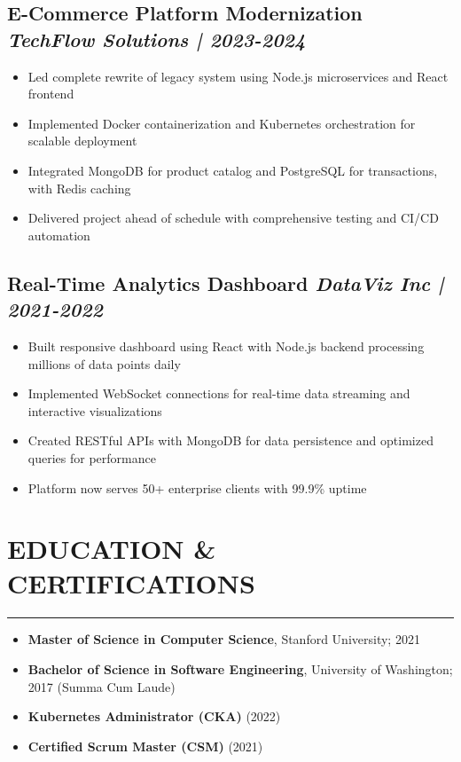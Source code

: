\documentclass[a4paper,10pt]{article}
\begin{document}
    \subsection*{E-Commerce Platform Modernization \hfill \textit{TechFlow Solutions | 2023-2024}}
    \vspace{-0.8em}
    \begin{itemize}[leftmargin=0.2cm, itemsep=0pt, label=--]
        \item Led complete rewrite of legacy system using Node.js microservices and React frontend
        \item Implemented Docker containerization and Kubernetes orchestration for scalable deployment
        \item Integrated MongoDB for product catalog and PostgreSQL for transactions, with Redis caching
        \item Delivered project ahead of schedule with comprehensive testing and CI/CD automation
    \end{itemize}

    \subsection*{Real-Time Analytics Dashboard \hfill \textit{DataViz Inc | 2021-2022}}
    \vspace{-0.8em}
    \begin{itemize}[leftmargin=0.2cm, itemsep=0pt, label=--]
        \item Built responsive dashboard using React with Node.js backend processing millions of data points daily
        \item Implemented WebSocket connections for real-time data streaming and interactive visualizations
        \item Created RESTful APIs with MongoDB for data persistence and optimized queries for performance
        \item Platform now serves 50+ enterprise clients with 99.9\% uptime
    \end{itemize}

    \section*{EDUCATION \& CERTIFICATIONS}
    \vspace{-0.8em}
    \hrule
    \vspace{0.2cm}
    \begin{itemize}[leftmargin=0.2cm, itemsep=0pt, label=--]
        \item \textbf{Master of Science in Computer Science}, Stanford University; 2021
        \item \textbf{Bachelor of Science in Software Engineering}, University of Washington; 2017 (Summa Cum Laude)
        \item \textbf{Kubernetes Administrator (CKA)} (2022)
        \item \textbf{Certified Scrum Master (CSM)} (2021)
    \end{itemize}
\end{document}
